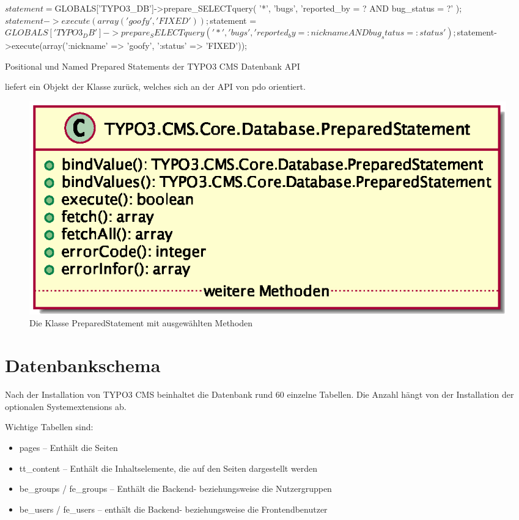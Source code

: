 \begin{listing}
\begin{phpcode}
$statement = $GLOBALS['TYPO3_DB']->prepare_SELECTquery(
  '*', 'bugs', 'reported_by = ? AND bug_status = ?'
);
$statement->execute(array('goofy', 'FIXED'));

$statement = $GLOBALS['TYPO3_DB']->prepare_SELECTquery(
  '*', 'bugs', 'reported_by = :nickname AND bug_status = :status'
);
$statement->execute(array(':nickname' => 'goofy', ':status' => 'FIXED'));
\end{phpcode}
\caption{Positional und Named Prepared Statements der TYPO3 CMS Datenbank API}
\label{lst:databaseOldPreparedStatement}
\end{listing}

 liefert ein Objekt der Klasse  zurück, welches sich an der API von \gls{pdo} orientiert.

\begin{figure}[H]
    \centering
    \includegraphics[scale=0.75]{gfx/uml/PreparedStatement.eps}
    \caption{Die Klasse PreparedStatement mit ausgewählten Methoden}
    \label{fig:selectedMethodsOfPreparedStatements}
\end{figure}

\section{Datenbankschema}
\label{currentSituation:subsec:databaseSchema}
Nach der Installation von TYPO3 CMS beinhaltet die Datenbank rund 60 einzelne Tabellen. Die Anzahl hängt von der Installation der optionalen Systemextensions ab.

Wichtige Tabellen sind:
\begin{itemize}
	\item pages – Enthält die Seiten
	\item tt\_content – Enthält die Inhaltselemente, die auf den Seiten dargestellt werden
	\item be\_groups / fe\_groups – Enthält die Backend- beziehungsweise die Nutzergruppen
	\item be\_users / fe\_users – enthält die Backend- beziehungsweise die Frontendbenutzer
\end{itemize}


